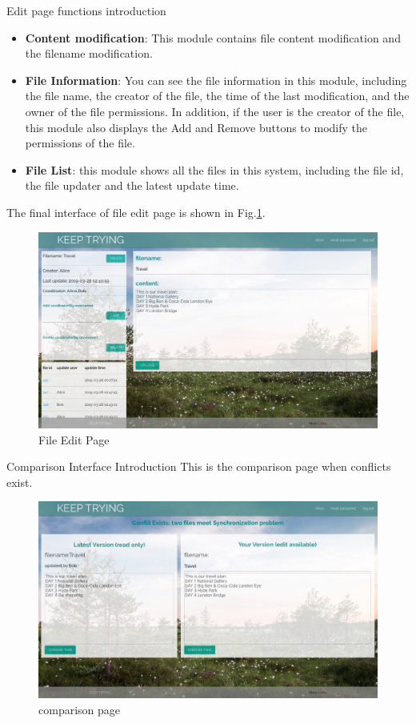 \noindent Edit page functions introduction
\begin{itemize}
    \item \textbf{Content modification}: This module contains file content modification and the filename modification.
   \item \textbf{File Information}: You can see the file information in this module, including the file name, the creator of the file, the time of the last modification, and the owner of the file permissions. In addition, if the user is the creator of the file, this module also displays the Add and Remove buttons to modify the permissions of the file.
    \item \textbf{File List}: this module shows all the files in this system, including the file id, the file updater and the latest update time.
\end{itemize} 
    
\noindent The final interface of file edit page is shown in Fig.\ref{edit}.    
     \begin{figure}[H]
     \centering
     \includegraphics[width=.8\textwidth]{fileeditui.jpeg}
     \caption{File Edit Page}
     \label{edit}
     \end{figure}
    
    


\noindent Comparison Interface Introduction
\vspace{0.2cm}
\newline \noindent This is the comparison page when conflicts exist. 

  \begin{figure}[H]
     \centering
     \includegraphics[width=.8\textwidth]{compare.jpeg}
     \caption{comparison page}
     \label{compare}
\end{figure}

